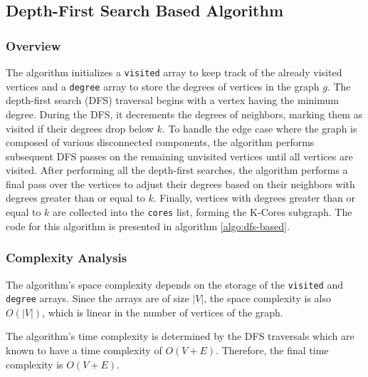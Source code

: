 \subsection{Depth-First Search Based Algorithm}

\subsubsection{Overview}

The algorithm initializes a \texttt{visited} array to keep track of the already visited vertices and a \texttt{degree} array to store the degrees of vertices in the graph \(g\). The depth-first search (DFS) traversal begins with a vertex having the minimum degree. During the DFS, it decrements the degrees of neighbors, marking them as visited if their degrees drop below \(k\). To handle the edge case where the graph is composed of various disconnected components, the algorithm performs subsequent DFS passes on the remaining unvisited vertices until all vertices are visited. After performing all the depth-first searches, the algorithm performs a final pass over the vertices to adjust their degrees based on their neighbors with degrees greater than or equal to \(k\). Finally, vertices with degrees greater than or equal to \(k\) are collected into the \texttt{cores} list, forming the K-Cores subgraph. The code for this algorithm is presented in algorithm \ref{algo:dfs-based}.



\subsubsection{Complexity Analysis}

The algorithm's space complexity depends on the storage of the \texttt{visited} and \texttt{degree} arrays. Since the arrays are of size \(|V|\), the space complexity is also \(O(|V|)\), which is linear in the number of vertices of the graph.

The algorithm's time complexity is determined by the DFS traversals which are known to have a time complexity of \(O(V + E)\). Therefore, the final time complexity is \(O(V + E)\).
    
    